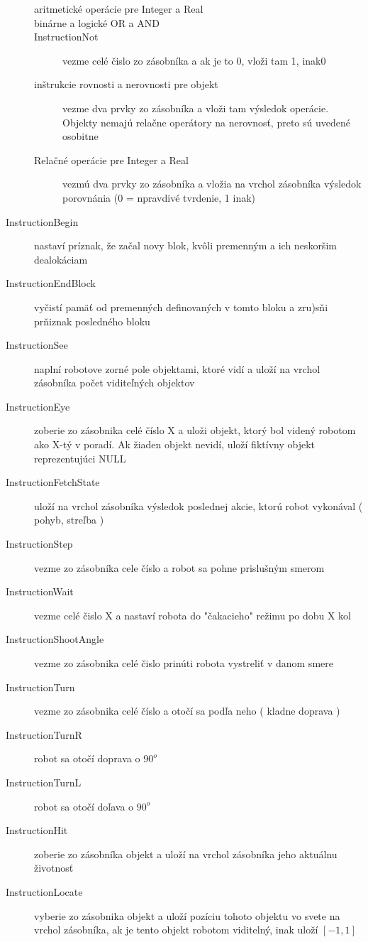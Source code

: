 \begin{description}
\begin{description}
   \item[aritmetické operácie pre Integer a Real]
    \item [binárne a logické OR a AND]
    \item [InstructionNot] vezme celé čislo zo zásobníka a ak je to 0, vloži tam 1, inak0  
    \item [inštrukcie rovnosti a nerovnosti pre objekt] vezme dva prvky zo zásobníka a vloži tam výsledok operácie. Objekty nemajú relačne operátory na nerovnosť, preto sú uvedené osobitne
   \item [Relačné operácie pre Integer a Real] vezmú dva prvky zo zásobníka a vložia na vrchol zásobníka výsledok porovnánia (0 = npravdivé tvrdenie, 1 inak)
\end{description}
\item [InstructionBegin] nastaví príznak, že začal novy blok, kvôli premenným a ich neskoršim dealokáciam
\item [InstructionEndBlock ] vyčistí pamäť od premenných definovaných v tomto bloku a zru)sňi prňiznak posledného bloku
\item [InstructionSee ] naplní robotove zorné pole objektami, ktoré vidí a uloží na vrchol zásobníka počet viditeľných objektov
\item [InstructionEye] zoberie zo zásobnika celé číslo X a uloži objekt, ktorý bol videný robotom ako X-tý v poradí. Ak žiaden objekt nevidí, uloží fiktívny objekt reprezentujúci NULL
\item [InstructionFetchState] uloží na vrchol zásobníka výsledok poslednej akcie, ktorú robot vykonával ( pohyb, streľba )
\item [InstructionStep ] vezme zo zásobníka cele číslo a robot sa pohne prislušným smerom
\item [InstructionWait ] vezme celé čislo X a nastaví robota do "čakacieho" režimu po dobu X kol
\item [InstructionShootAngle ] vezme zo zásobnika celé čislo prinúti robota vystreliť v danom smere
\item [InstructionTurn] vezme zo zásobnika celé číslo a otočí sa podľa neho ( kladne doprava )
\item [InstructionTurnR ] robot sa otočí doprava o $90^o $
\item [InstructionTurnL] robot sa otočí doľava o $90^o$
\item [InstructionHit] zoberie zo zásobníka objekt a uloží na vrchol zásobníka jeho aktuálnu životnosť
\item [InstructionLocate] vyberie zo zásobnika objekt a uloží pozíciu tohoto objektu vo svete na vrchol zásobníka, ak je tento objekt robotom viditelný, inak uloží $[-1,1]$

\end{description}
